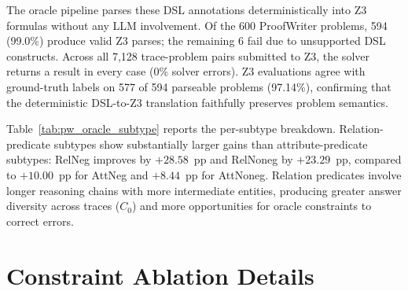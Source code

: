 The oracle pipeline parses these DSL annotations deterministically into Z3 formulas without any LLM involvement. Of the 600 ProofWriter problems, 594 (99.0\%) produce valid Z3 parses; the remaining 6 fail due to unsupported DSL constructs. Across all 7{,}128 trace-problem pairs submitted to Z3, the solver returns a result in every case (0\% solver errors). Z3 evaluations agree with ground-truth labels on 577 of 594 parseable problems (97.14\%), confirming that the deterministic DSL-to-Z3 translation faithfully preserves problem semantics.

Table~\ref{tab:pw_oracle_subtype} reports the per-subtype breakdown. Relation-predicate subtypes show substantially larger gains than attribute-predicate subtypes: RelNeg improves by $+28.58$~pp and RelNoneg by $+23.29$~pp, compared to $+10.00$~pp for AttNeg and $+8.44$~pp for AttNoneg. Relation predicates involve longer reasoning chains with more intermediate entities, producing greater answer diversity across traces ($C_0$) and more opportunities for oracle constraints to correct errors.

\begin{table}[h]
\centering
\caption{ProofWriter oracle experiment per-subtype breakdown. Oracle-SICA uses gold DSL annotations parsed deterministically to Z3 for consistency checking. Relation-predicate subtypes (RelNeg, RelNoneg) show larger gains than attribute-predicate subtypes; relation subtypes involve longer reasoning chains and benefit more from oracle constraints. Bold indicates best accuracy per row.}
\label{tab:pw_oracle_subtype}
\end{table}


\section{Constraint Ablation Details}
\label{app:ablation}
\label{sec:ablation}

